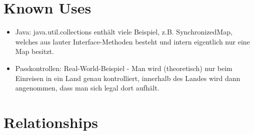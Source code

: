 \section{Known Uses}
\begin{itemize}
  \item Java: java.util.collections enthält viele Beispiel, z.B. SynchronizedMap, welches aus lauter Interface-Methoden besteht und intern eigentlich nur eine Map besitzt.
  \item Passkontrollen: Real-World-Beispiel - Man wird (theoretisch) nur beim Einreisen in ein Land genau kontrolliert, innerhalb des Landes wird dann angenommen, dass man sich legal dort aufhält.
\end{itemize}

\section{Relationships}

